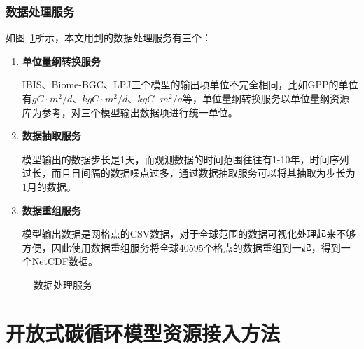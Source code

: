 \subsubsection{数据处理服务}
如图~\ref{fig:data-process-service}所示，本文用到的数据处理服务有三个：
\begin{enumerate}[(1)]
    \item \textbf{单位量纲转换服务}
    
    IBIS、Biome-BGC、LPJ三个模型的输出项单位不完全相同，比如GPP的单位有$gC \cdot m^2/d$、$kgC \cdot m^2/d$、$kgC \cdot m^2/a$等，单位量纲转换服务以单位量纲资源库为参考，对三个模型输出数据项进行统一单位。

    \item \textbf{数据抽取服务}
    
    模型输出的数据步长是1天，而观测数据的时间范围往往有1-10年，时间序列过长，而且日间隔的数据噪点过多，通过数据抽取服务可以将其抽取为步长为1月的数据。
    
    \item \textbf{数据重组服务}
    
    模型输出数据是网格点的CSV数据，对于全球范围的数据可视化处理起来不够方便，因此使用数据重组服务将全球40595个格点的数据重组到一起，得到一个NetCDF数据。

\end{enumerate}

\begin{figure}[!htbp]
    \centering
    \hfill
    \hfill
    \caption{数据处理服务}
    \label{fig:data-process-service}
\end{figure}


\section{开放式碳循环模型资源接入方法}


